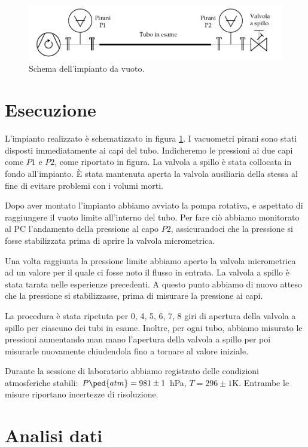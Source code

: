 \begin{figure}[b]
    \includegraphics[width=160mm]{drawing.pdf}
    \caption{Schema dell'impianto da vuoto.}
    \label{fig:schema}
\end{figure}

\section{Esecuzione}

L'impianto realizzato è schematizzato in figura \ref{fig:schema}. I vacuometri pirani sono stati disposti
immediatamente ai capi del tubo. Indicheremo le pressioni ai due capi come $P1$ e $P2$, come riportato in figura.
La valvola a spillo è stata collocata in fondo all'impianto. È stata mantenuta
aperta la valvola ausiliaria della stessa al fine di evitare problemi con i volumi morti. 

Dopo aver montato l'impianto abbiamo avviato la pompa rotativa, e aspettato di raggiungere il vuoto limite all'interno
del tubo. Per fare ciò abbiamo monitorato al PC l'andamento della pressione al capo $P2$, assicurandoci che la pressione
si fosse stabilizzata prima di aprire la valvola micrometrica.

Una volta raggiunta la pressione limite abbiamo aperto la valvola micrometrica ad un valore per il quale ci fosse noto
il flusso in entrata. La valvola a spillo è stata tarata nelle esperienze precedenti. A questo punto abbiamo di nuovo
atteso che la pressione si stabilizzasse, prima di misurare la pressione ai capi. 

La procedura è stata ripetuta per 0, 4, 5, 6, 7, 8 giri di apertura della valvola a spillo per ciascuno dei
tubi in esame. Inoltre, per ogni tubo, abbiamo misurato le pressioni aumentando man mano l'apertura della valvola
a spillo per poi misurarle nuovamente chiudendola fino a tornare al valore iniziale.

Durante la sessione di laboratorio abbiamo registrato delle condizioni atmosferiche stabili: $P\ped{atm} = 981 \pm 1$ hPa,
$T = 296 \pm 1 \si{\kelvin}$. Entrambe le misure riportano incertezze di risoluzione.

\section{Analisi dati}


